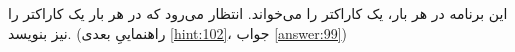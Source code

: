 \section{}
\paragraph{}\label{hint:10}
این برنامه در هر بار، یک کاراکتر را می‌خواند. انتظار می‌رود که در هر بار یک کاراکتر را نیز بنویسد. (راهنماییِ بعدی \ref{hint:102}، جواب \ref{answer:99})